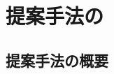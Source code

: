 \documentclass[../main]{subfiles}
\begin{document}
\setcounter{secnumdepth}{2}
    \chapter{提案手法の}
        \section{提案手法の概要}
        \section{}
        \section{}
        \section{}
\end{document}
